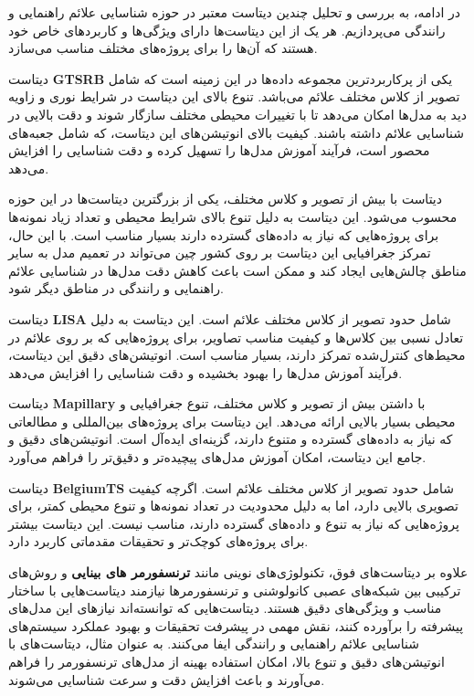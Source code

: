 در ادامه، به بررسی و تحلیل چندین دیتاست معتبر در حوزه شناسایی علائم راهنمایی و رانندگی می‌پردازیم. هر یک از این دیتاست‌ها دارای ویژگی‌ها و کاربردهای خاص خود هستند که آن‌ها را برای پروژه‌های مختلف مناسب می‌سازد. 

دیتاست \textbf{GTSRB} یکی از پرکاربردترین مجموعه داده‌ها در این زمینه است که شامل  تصویر از  کلاس مختلف علائم می‌باشد. تنوع بالای این دیتاست در شرایط نوری و زاویه دید به مدل‌ها امکان می‌دهد تا با تغییرات محیطی مختلف سازگار شوند و دقت بالایی در شناسایی علائم داشته باشند. کیفیت بالای انوتیشن‌های این دیتاست، که شامل جعبه‌های محصور است، فرآیند آموزش مدل‌ها را تسهیل کرده و دقت شناسایی را افزایش می‌دهد.

دیتاست \textbf{} با بیش از  تصویر و  کلاس مختلف، یکی از بزرگترین دیتاست‌ها در این حوزه محسوب می‌شود. این دیتاست به دلیل تنوع بالای شرایط محیطی و تعداد زیاد نمونه‌ها برای پروژه‌هایی که نیاز به داده‌های گسترده دارند بسیار مناسب است. با این حال، تمرکز جغرافیایی این دیتاست بر روی کشور چین می‌تواند در تعمیم مدل به سایر مناطق چالش‌هایی ایجاد کند و ممکن است باعث کاهش دقت مدل‌ها در شناسایی علائم راهنمایی و رانندگی در مناطق دیگر شود.

دیتاست \textbf{LISA} شامل حدود  تصویر از  کلاس مختلف علائم است. این دیتاست به دلیل تعادل نسبی بین کلاس‌ها و کیفیت مناسب تصاویر، برای پروژه‌هایی که بر روی علائم در محیط‌های کنترل‌شده تمرکز دارند، بسیار مناسب است. انوتیشن‌های دقیق این دیتاست، فرآیند آموزش مدل‌ها را بهبود بخشیده و دقت شناسایی را افزایش می‌دهد.

دیتاست \textbf{Mapillary} با داشتن بیش از  تصویر و  کلاس مختلف، تنوع جغرافیایی و محیطی بسیار بالایی ارائه می‌دهد. این دیتاست برای پروژه‌های بین‌المللی و مطالعاتی که نیاز به داده‌های گسترده و متنوع دارند، گزینه‌ای ایده‌آل است. انوتیشن‌های دقیق و جامع این دیتاست، امکان آموزش مدل‌های پیچیده‌تر و دقیق‌تر را فراهم می‌آورد.

دیتاست \textbf{BelgiumTS} شامل حدود  تصویر از  کلاس مختلف علائم است. اگرچه کیفیت تصویری بالایی دارد، اما به دلیل محدودیت در تعداد نمونه‌ها و تنوع محیطی کمتر، برای پروژه‌هایی که نیاز به تنوع و داده‌های گسترده دارند، مناسب نیست. این دیتاست بیشتر برای پروژه‌های کوچک‌تر و تحقیقات مقدماتی کاربرد دارد.


علاوه بر دیتاست‌های فوق، تکنولوژی‌های نوینی مانند \textbf{ترنسفورمر های بینایی  } و روش‌های ترکیبی بین شبکه‌های عصبی کانولوشنی و ترنسفورمرها نیازمند دیتاست‌هایی با ساختار مناسب و ویژگی‌های دقیق هستند. دیتاست‌هایی که توانسته‌اند نیازهای این مدل‌های پیشرفته را برآورده کنند، نقش مهمی در پیشرفت تحقیقات و بهبود عملکرد سیستم‌های شناسایی علائم راهنمایی و رانندگی ایفا می‌کنند. به عنوان مثال، دیتاست‌های با انوتیشن‌های دقیق و تنوع بالا، امکان استفاده بهینه از مدل‌های ترنسفورمر را فراهم می‌آورند و باعث افزایش دقت و سرعت شناسایی می‌شوند.









